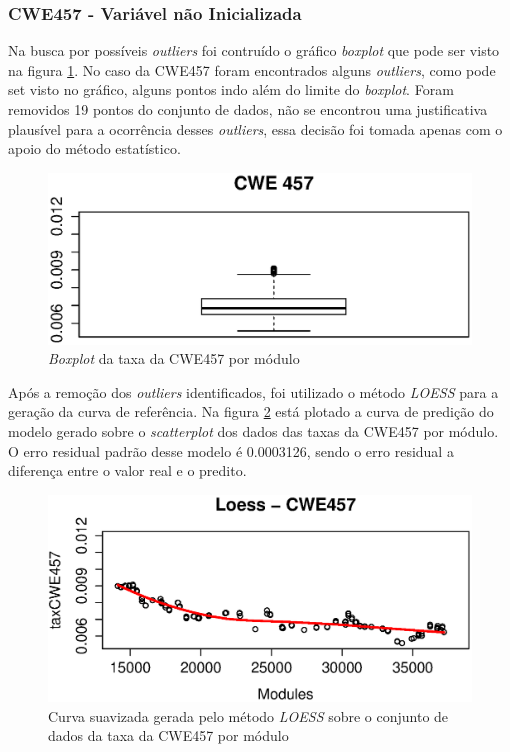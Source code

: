 \subsubsection{CWE457 - Variável não Inicializada}

Na busca por possíveis \textit{outliers} foi contruído o gráfico
\textit{boxplot} que pode ser visto na figura \ref{fig:cwe457-boxplot}. No caso
da CWE457 foram encontrados alguns \textit{outliers}, como pode set visto no
gráfico, alguns pontos indo além do limite do \textit{boxplot}. Foram removidos
19 pontos do conjunto de dados, não se encontrou uma justificativa plausível
para a ocorrência desses \textit{outliers}, essa decisão foi tomada apenas com o
apoio do método estatístico.

\begin{figure}[h]
  \centering
  \includegraphics[width=1.0\textwidth]
      {figuras/cwe457-boxplot.eps}
      \caption{\textit{Boxplot} da taxa da CWE457 por módulo}
  \label{fig:cwe457-boxplot}
\end{figure}

Após a remoção dos \textit{outliers} identificados, foi utilizado o método
\textit{LOESS} para a geração da curva de referência. Na figura
\ref{fig:cwe457-loess} está plotado a curva de predição do modelo gerado sobre o
\textit{scatterplot} dos dados das taxas da CWE457 por módulo. O erro residual
padrão desse modelo é 0.0003126, sendo o erro residual a diferença entre o valor
real e o predito.

\begin{figure}[h]
  \centering
  \includegraphics[width=1.0\textwidth]
      {figuras/cwe457-loess.eps}
      \caption{Curva suavizada gerada pelo método \textit{LOESS} sobre o
      conjunto de dados da taxa da CWE457 por módulo}
  \label{fig:cwe457-loess}
\end{figure}

